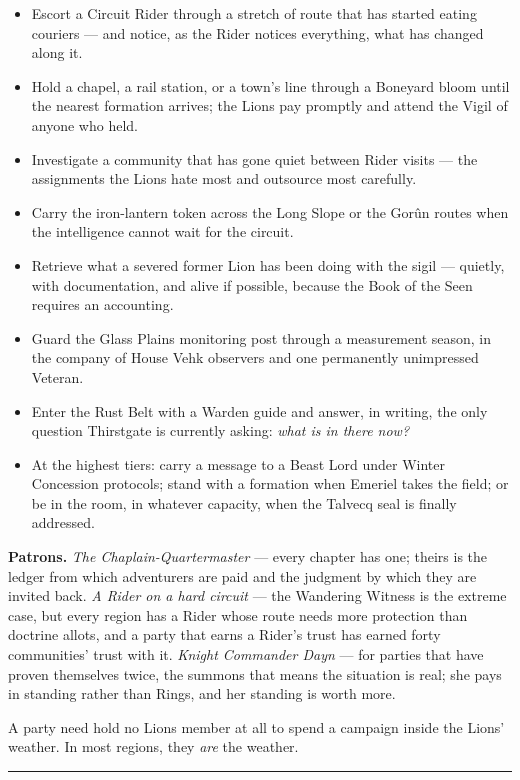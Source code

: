 \begin{itemize}
    \item Escort a Circuit Rider through a stretch of route that has started eating couriers --- and notice, as the Rider notices everything, what has changed along it.
    \item Hold a chapel, a rail station, or a town's line through a Boneyard bloom until the nearest formation arrives; the Lions pay promptly and attend the Vigil of anyone who held.
    \item Investigate a community that has gone quiet between Rider visits --- the assignments the Lions hate most and outsource most carefully.
    \item Carry the iron-lantern token across the Long Slope or the Gorûn routes when the intelligence cannot wait for the circuit.
    \item Retrieve what a severed former Lion has been doing with the sigil --- quietly, with documentation, and alive if possible, because the Book of the Seen requires an accounting.
    \item Guard the Glass Plains monitoring post through a measurement season, in the company of House Vehk observers and one permanently unimpressed Veteran.
    \item Enter the Rust Belt with a Warden guide and answer, in writing, the only question Thirstgate is currently asking: \textit{what is in there now?}
    \item At the highest tiers: carry a message to a Beast Lord under Winter Concession protocols; stand with a formation when Emeriel takes the field; or be in the room, in whatever capacity, when the Talvecq seal is finally addressed.
\end{itemize}

\textbf{Patrons.} \textit{The Chaplain-Quartermaster} --- every chapter has one; theirs is the ledger from which adventurers are paid and the judgment by which they are invited back. \textit{A Rider on a hard circuit} --- the Wandering Witness is the extreme case, but every region has a Rider whose route needs more protection than doctrine allots, and a party that earns a Rider's trust has earned forty communities' trust with it. \textit{Knight Commander Dayn} --- for parties that have proven themselves twice, the summons that means the situation is real; she pays in standing rather than Rings, and her standing is worth more.

A party need hold no Lions member at all to spend a campaign inside the Lions' weather. In most regions, they \textit{are} the weather.

\medskip\hrule\medskip
